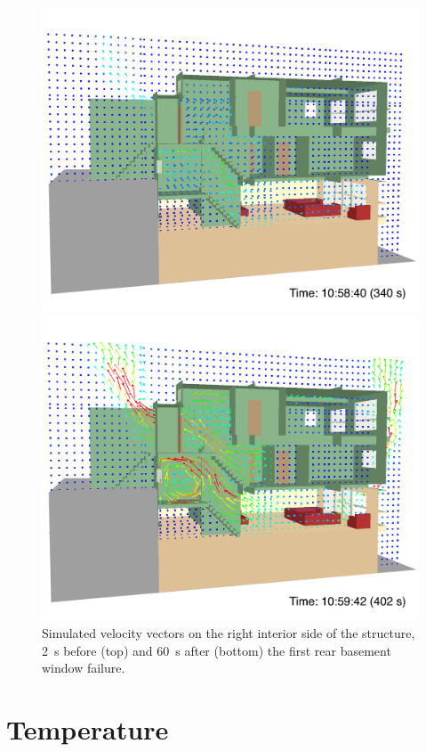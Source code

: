 \documentclass[12pt,oneside]{book}
\begin{document}
\begin{figure}[!ht]
\includegraphics[width=4.5in]{../Figures/SMV_Vel_Vec_340_s}


\includegraphics[width=4.5in]{../Figures/SMV_Vel_Vec_402_s}


\caption[Simulated velocity vectors on the right interior side of the structure.]
{Simulated velocity vectors on the right interior side of the structure, 2~s before (top) and 60~s after (bottom) the first rear basement window failure.}
\label{fig:smv_velocity_vectors}
\end{figure}


\clearpage


\section{Temperature}
\label{sec:temperature}
\end{document}
